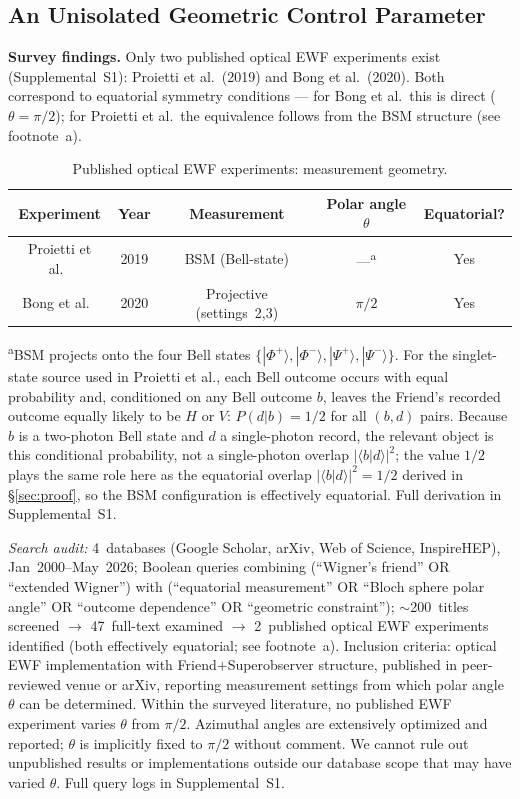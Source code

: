\documentclass[twocolumn,aps,pra,superscriptaddress,floatfix,10pt]{revtex4-2}
\begin{document}
\subsection{An Unisolated Geometric Control Parameter}
\label{sec:survey}

\textbf{Survey findings.} Only two published optical EWF experiments exist
(Supplemental~S1): Proietti et al.\ (2019) and Bong et al.\ (2020). Both
correspond to equatorial symmetry conditions --- for Bong et al.\ this is
direct ($\theta = \pi/2$); for Proietti et al.\ the equivalence follows from the
BSM structure (see footnote~a).

\begin{table}[H]
\centering
\caption{Published optical EWF experiments: measurement geometry.}
\label{tab:survey}
\begin{tabular}{ccccc}
\toprule
Experiment & Year & Measurement & Polar angle $\theta$ & Equatorial? \\
\midrule
Proietti et al.\ & 2019 & BSM (Bell-state) & ---\textsuperscript{a} & Yes \\
Bong et al.\ & 2020 & Projective (settings~2,3) & $\pi/2$ & Yes \\
\bottomrule
\end{tabular}
\end{table}
\vspace{-0.5em}
{\footnotesize \textsuperscript{a}BSM projects onto the four Bell states $\{|\Phi^+\rangle, |\Phi^-\rangle, |\Psi^+\rangle, |\Psi^-\rangle\}$. For the
singlet-state source used in Proietti et al., each Bell outcome occurs with
equal probability and, conditioned on any Bell outcome $b$, leaves the Friend's
recorded outcome equally likely to be $H$ or $V$: $P(d|b) = 1/2$ for all $(b,d)$ pairs.
Because $b$ is a two-photon Bell state and $d$ a single-photon record, the relevant
object is this conditional probability, not a single-photon overlap $|\langle b|d\rangle|^2$;
the value $1/2$ plays the same role here as the equatorial overlap $|\langle b|d\rangle|^2 = 1/2$
derived in \S\ref{sec:proof}, so the BSM configuration is effectively equatorial. Full
derivation in Supplemental~S1.\par}

\emph{Search audit:} 4~databases (Google Scholar, arXiv, Web of Science, InspireHEP),
Jan~2000--May~2026; Boolean queries combining (``Wigner's friend'' OR
``extended Wigner'') with (``equatorial measurement'' OR ``Bloch sphere polar
angle'' OR ``outcome dependence'' OR ``geometric constraint''); $\sim$200~titles
screened $\to$ 47~full-text examined $\to$ 2~published optical EWF experiments
identified (both effectively equatorial; see footnote~a). Inclusion
criteria: optical EWF implementation with Friend$+$Superobserver structure,
published in peer-reviewed venue or arXiv, reporting measurement settings
from which polar angle $\theta$ can be determined. Within the surveyed literature,
no published EWF experiment varies $\theta$ from $\pi/2$. Azimuthal angles are
extensively optimized and reported; $\theta$ is implicitly fixed to $\pi/2$ without
comment. We cannot rule out unpublished results or implementations outside
our database scope that may have varied $\theta$. Full query logs in Supplemental~S1.
\end{document}
